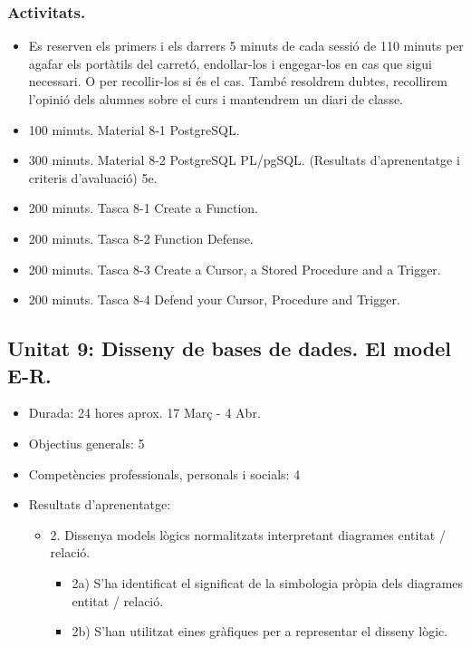 \documentclass[catalan, a4paper, 12pt, titlepage]{article}
\begin{document}
  \subsubsection{Activitats.}
  \begin{itemize}
          \item Es reserven els primers i els darrers 5 minuts de cada sessió de 110 minuts per agafar els portàtils del carretó, endollar-los i engegar-los en cas que sigui necessari. O per recollir-los si és el cas. També resoldrem dubtes, recollirem l'opinió dels alumnes sobre el curs i mantendrem un diari de classe.
	  \item 100 minuts. Material 8-1 PostgreSQL.
	  \item 300 minuts. Material 8-2 PostgreSQL PL/pgSQL. (\faGraduationCap Resultats d'aprenentatge i criteris d'avaluació) 5e.
	  \item 200 minuts. Tasca 8-1 Create a Function.
	  \item 200 minuts. Tasca 8-2 Function Defense.
	  \item 200 minuts. Tasca 8-3 Create a Cursor, a Stored Procedure and a Trigger.
	  \item 200 minuts. Tasca 8-4 Defend your Cursor, Procedure and Trigger.
  \end{itemize}

  \subsection{Unitat 9: Disseny de bases de dades. El model E-R.}

  \begin{itemize}
	\item Durada: 24 hores aprox. 17 Març - 4 Abr.
	\item Objectius generals: 5
	\item Competències professionals, personals i socials: 4
	\item Resultats d'aprenentatge: 
		\begin{itemize}
			\item 2. Dissenya models lògics normalitzats interpretant diagrames entitat / relació.
				\begin{itemize}
					\item 2a) S'ha identificat el significat de la simbologia pròpia dels diagrames entitat / relació.
					\item 2b) S'han utilitzat eines gràfiques per a representar el disseny lògic.
				\end{itemize}
		\end{itemize}
  \end{itemize}
\end{document}
